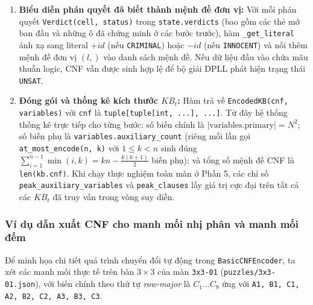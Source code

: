 \documentclass[12pt,a4paper]{article}
\begin{document}
\begin{enumerate}
    \item \textbf{Biểu diễn phán quyết đã biết thành mệnh đề đơn vị:} Với mỗi phán quyết \texttt{Verdict(cell, status)} trong \texttt{state.verdicts} (bao gồm các thẻ mở ban đầu và những ô đã chứng minh ở các bước trước), hàm \texttt{\_get\_literal} ánh xạ sang literal $+id$ (nếu \texttt{CRIMINAL}) hoặc $-id$ (nếu \texttt{INNOCENT}) và nối thêm mệnh đề đơn vị $(l,)$ vào danh sách mệnh đề. Nếu dữ liệu đầu vào chứa mâu thuẫn logic, CNF vẫn được sinh hợp lệ để bộ giải DPLL phát hiện trạng thái \texttt{UNSAT}.
    \item \textbf{Đóng gói và thống kê kích thước $KB_t$:} Hàm trả về \texttt{EncodedKB(cnf, variables)} với \texttt{cnf} là \texttt{tuple[tuple[int, ...], ...]}. Từ đây hệ thống thống kê trực tiếp cho từng bước: số biến chính là $|\text{variables.primary}| = N^2$; số biến phụ là \texttt{variables.auxiliary\_count} (riêng mỗi lần gọi \texttt{at\_most\_encode(n, k)} với $1 \le k < n$ sinh đúng $\sum_{i=1}^{n-1}\min(i, k) = kn - \frac{k(k+1)}{2}$ biến phụ); và tổng số mệnh đề CNF là \texttt{len(kb.cnf)}. Khi chạy thực nghiệm toàn màn ở Phần 5, các chỉ số \texttt{peak\_auxiliary\_variables} và \texttt{peak\_clauses} lấy giá trị cực đại trên tất cả các $KB_t$ đã truy vấn trong vòng suy diễn.
\end{enumerate}

\subsubsection{Ví dụ dẫn xuất CNF cho manh mối nhị phân và manh mối đếm}
Để minh họa chi tiết quá trình chuyển đổi tự động trong \texttt{BasicCNFEncoder}, ta xét các manh mối thực tế trên bàn $3 \times 3$ của màn \texttt{3x3-01} (\texttt{puzzles/3x3-01.json}), với biến chính theo thứ tự \emph{row-major} là $C_1 \dots C_9$ ứng với \texttt{A1, B1, C1, A2, B2, C2, A3, B3, C3}.
\end{document}
